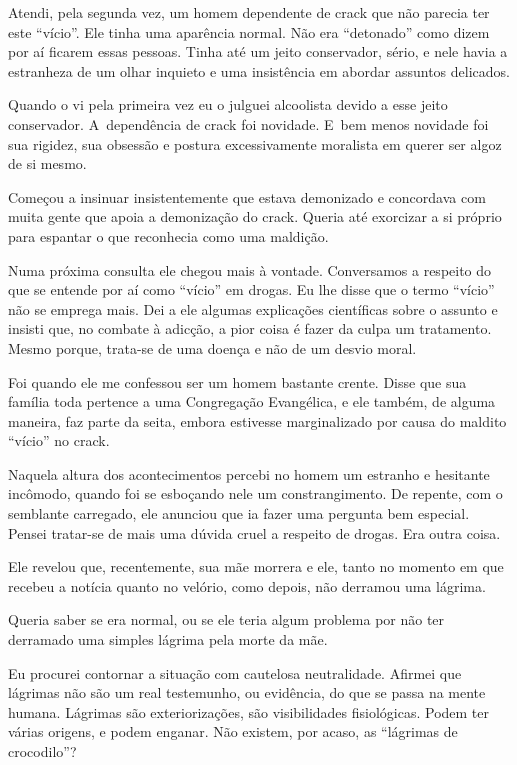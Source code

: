  

Atendi, pela segunda vez, um homem dependente de crack que não parecia
ter este ``vício''. Ele tinha uma aparência normal. Não era ``detonado''
como dizem por aí ficarem essas pessoas. Tinha até um jeito conservador,
sério, e nele havia a estranheza de um olhar inquieto e uma insistência
em abordar assuntos delicados.

Quando o vi pela primeira vez eu o julguei alcoolista devido a esse
jeito conservador. A~dependência de crack foi novidade. E~bem menos
novidade foi sua rigidez, sua obsessão e postura excessivamente
moralista em querer ser algoz de si mesmo.

Começou a insinuar insistentemente que estava demonizado e concordava
com muita gente que apoia a demonização do crack. Queria até exorcizar a
si próprio para espantar o que reconhecia como uma maldição.

\asterisc{}

Numa próxima consulta ele chegou mais à vontade. Conversamos a respeito
do que se entende por aí como ``vício'' em drogas. Eu lhe disse que o
termo ``vício'' não se emprega mais. Dei a ele algumas explicações
científicas sobre o assunto e insisti que, no combate à adicção, a pior
coisa é fazer da culpa um tratamento. Mesmo porque, trata-se de uma
doença e não de um desvio moral.

Foi quando ele me confessou ser um homem bastante crente. Disse que sua
família toda pertence a uma Congregação Evangélica, e ele também, de
alguma maneira, faz parte da seita, embora estivesse marginalizado por
causa do maldito ``vício'' no crack.

Naquela altura dos acontecimentos percebi no homem um estranho e
hesitante incômodo, quando foi se esboçando nele um constrangimento. De
repente, com o semblante carregado, ele anunciou que ia fazer uma
pergunta bem especial. Pensei tratar-se de mais uma dúvida cruel a
respeito de drogas. Era outra coisa.

Ele revelou que, recentemente, sua mãe morrera e ele, tanto no momento
em que recebeu a notícia quanto no velório, como depois, não derramou
uma lágrima.

Queria saber se era normal, ou se ele teria algum problema por não ter
derramado uma simples lágrima pela morte da mãe.

Eu procurei contornar a situação com cautelosa neutralidade. Afirmei que
lágrimas não são um real testemunho, ou evidência, do que se passa na
mente humana. Lágrimas são exteriorizações, são visibilidades
fisiológicas. Podem ter várias origens, e podem enganar. Não existem,
por acaso, as ``lágrimas de crocodilo''?

